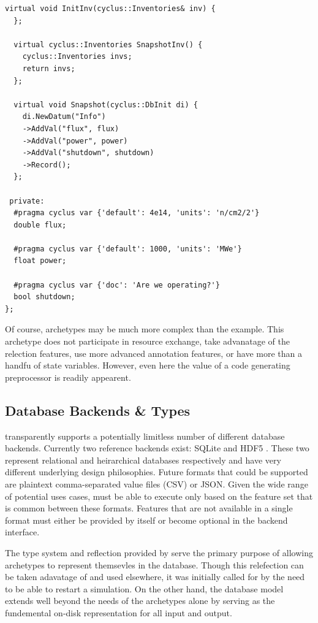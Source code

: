 \begin{lstlisting}[caption={Simple Reactor Archetype After Preprocessing with \cycpp, 
                            line marker directives have been removed for space}, 
                   label=rx-eg-cycpp]
  virtual void InitInv(cyclus::Inventories& inv) {
  };

  virtual cyclus::Inventories SnapshotInv() {
    cyclus::Inventories invs;
    return invs;
  };

  virtual void Snapshot(cyclus::DbInit di) {
    di.NewDatum("Info")
    ->AddVal("flux", flux)
    ->AddVal("power", power)
    ->AddVal("shutdown", shutdown)
    ->Record();
  };

 private:
  #pragma cyclus var {'default': 4e14, 'units': 'n/cm2/2'}
  double flux;

  #pragma cyclus var {'default': 1000, 'units': 'MWe'}
  float power;

  #pragma cyclus var {'doc': 'Are we operating?'}
  bool shutdown;
};
\end{lstlisting}

Of course, archetypes may be much more complex than the  example.
This archetype does not participate in resource exchange, take advanatage of 
the relection features, use more advanced annotation features, or have more than 
a handfu of state variables.  However, even here the value of a code generating
preprocessor is readily appearent.

\subsection{Database Backends \& Types}

\Cyclus transparently supports a potentially limitless number of different database 
backends. Currently two reference backends exist: SQLite \cite{owens2006definitive} 
and HDF5 \cite{folk2011overview}. These two represent relational and heirarchical 
databases respectively and have very different underlying design philosophies.
Future formats that could be supported are plaintext comma-separated value files 
(CSV) or JSON.  Given the wide range of potential uses cases, \cyclus must be able 
to execute only based on the feature set that is common between these formats.
Features that are not available in a single format must either be provided by \cyclus 
itself or become optional in the backend interface.

The type system and reflection provided by \cycpp serve the primary purpose of 
allowing archetypes to represent themsevles in the database. Though this 
relefection can be taken adavatage of and used elsewhere, it was initially called for 
by the need to be able to restart a simulation. On the other hand, 
the database model extends well beyond the needs of the archetypes alone by 
serving as the fundemental on-disk representation for all \cyclus input and output.


